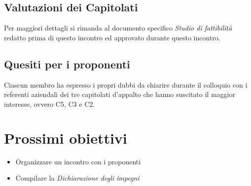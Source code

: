 \subsection{Valutazioni dei Capitolati}
    Per maggiori dettagli si rimanda al documento specifico \textit{Studio di fattibilità} redatto prima di questo incontro ed approvato durante questo incontro.
\subsection{Quesiti per i proponenti}
    Ciascun membro ha espresso i propri dubbi da chiarire durante il colloquio con i referenti aziendali dei tre capitolati d'appalto che hanno suscitato il maggior interesse, ovvero C5, C3 e C2.
\section{Prossimi obiettivi}
    \begin{itemize}
        \item Organizzare un incontro con i proponenti
        \item Compilare la \textit{Dichiarazione degli impegni}
    \end{itemize}
